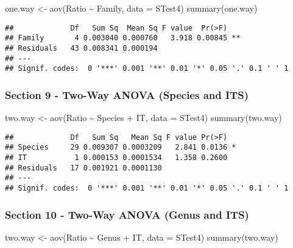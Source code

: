 \documentclass[
]{article}
\newenvironment{Shaded}{\begin{snugshade}}{\end{snugshade}}
\newcommand{\AttributeTok}[1]{\textcolor[rgb]{0.77,0.63,0.00}{#1}}
\newcommand{\FunctionTok}[1]{\textcolor[rgb]{0.00,0.00,0.00}{#1}}
\newcommand{\NormalTok}[1]{#1}
\newcommand{\OtherTok}[1]{\textcolor[rgb]{0.56,0.35,0.01}{#1}}
\newcommand{\SpecialCharTok}[1]{\textcolor[rgb]{0.00,0.00,0.00}{#1}}
\begin{document}
\begin{Shaded}
\begin{Highlighting}[]
\NormalTok{one.way }\OtherTok{\textless{}{-}} \FunctionTok{aov}\NormalTok{(Ratio }\SpecialCharTok{\textasciitilde{}}\NormalTok{ Family, }\AttributeTok{data =}\NormalTok{ STest4)}
\FunctionTok{summary}\NormalTok{(one.way)}
\end{Highlighting}
\end{Shaded}

\begin{verbatim}
##             Df   Sum Sq  Mean Sq F value  Pr(>F)   
## Family       4 0.003040 0.000760   3.918 0.00845 **
## Residuals   43 0.008341 0.000194                   
## ---
## Signif. codes:  0 '***' 0.001 '**' 0.01 '*' 0.05 '.' 0.1 ' ' 1
\end{verbatim}

\hypertarget{section-9---two-way-anova-species-and-its}{%
\subsubsection{Section 9 - Two-Way ANOVA (Species and
ITS)}\label{section-9---two-way-anova-species-and-its}}

\begin{Shaded}
\begin{Highlighting}[]
\NormalTok{two.way }\OtherTok{\textless{}{-}} \FunctionTok{aov}\NormalTok{(Ratio }\SpecialCharTok{\textasciitilde{}}\NormalTok{ Species }\SpecialCharTok{+}\NormalTok{ IT, }\AttributeTok{data =}\NormalTok{ STest4)}
\FunctionTok{summary}\NormalTok{(two.way)}
\end{Highlighting}
\end{Shaded}

\begin{verbatim}
##             Df   Sum Sq   Mean Sq F value Pr(>F)  
## Species     29 0.009307 0.0003209   2.841 0.0136 *
## IT           1 0.000153 0.0001534   1.358 0.2600  
## Residuals   17 0.001921 0.0001130                 
## ---
## Signif. codes:  0 '***' 0.001 '**' 0.01 '*' 0.05 '.' 0.1 ' ' 1
\end{verbatim}

\hypertarget{section-10---two-way-anova-genus-and-its}{%
\subsubsection{Section 10 - Two-Way ANOVA (Genus and
ITS)}\label{section-10---two-way-anova-genus-and-its}}

\begin{Shaded}
\begin{Highlighting}[]
\NormalTok{two.way }\OtherTok{\textless{}{-}} \FunctionTok{aov}\NormalTok{(Ratio }\SpecialCharTok{\textasciitilde{}}\NormalTok{ Genus }\SpecialCharTok{+}\NormalTok{ IT, }\AttributeTok{data =}\NormalTok{ STest4)}
\FunctionTok{summary}\NormalTok{(two.way)}
\end{Highlighting}
\end{Shaded}
\end{document}
